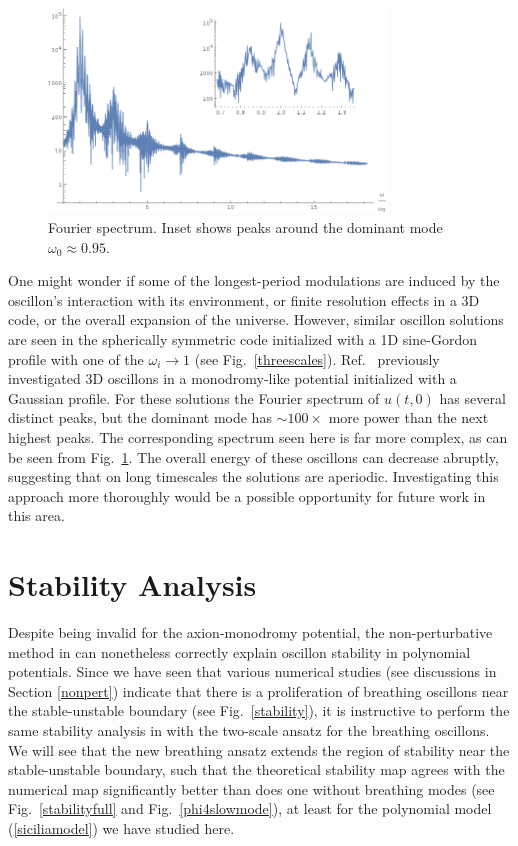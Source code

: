 \documentclass[11pt]{book}
\begin{document}
\begin{figure}
  \centering
  \includegraphics[width=0.8\textwidth]{plot/fourier.png}
  \caption{Fourier spectrum. Inset shows peaks around the dominant mode $\omega_0\approx0.95$.}\label{fourier}
\end{figure}

One might wonder if some of the longest-period modulations are induced by the oscillon's interaction with its environment, or finite resolution effects in a 3D code, or the overall expansion of the universe. However, similar oscillon solutions are seen in the spherically symmetric code initialized with a 1D sine-Gordon profile with one of the $\omega_i\to1$ (see Fig.~\ref{threescales}). Ref.~\cite{Salmi:2012ta} previously investigated 3D oscillons in a monodromy-like potential initialized with a Gaussian profile. For these solutions the Fourier spectrum of $u(t,0)$ has several distinct peaks, but the dominant mode has $\sim 100\times$ more power than the next highest peaks. The corresponding spectrum seen here is far more complex,  as can be seen from  Fig.~\ref{fourier}. The overall energy of these oscillons can decrease abruptly, suggesting that on long timescales the solutions are aperiodic. Investigating this approach more thoroughly would be a possible opportunity for future work in this area.

\chapter{Stability Analysis}\label{chap:stability}

Despite being invalid for the axion-monodromy potential, the non-perturbative method in \cite{Gleiser:2008ty, PhysRevD.80.125037} can nonetheless correctly explain oscillon stability in polynomial potentials. Since we have seen that various numerical studies (see discussions in Section \ref{nonpert}) indicate that there is a proliferation of breathing oscillons near the stable-unstable boundary (see Fig.~\ref{stability}), it is instructive to perform the same stability analysis in \cite{Gleiser:2008ty, PhysRevD.80.125037} with the two-scale ansatz for the breathing oscillons. We will see that the new breathing ansatz extends the region of stability near the stable-unstable boundary, such that the theoretical stability map agrees with the numerical map significantly better than does one without breathing modes (see Fig.~\ref{stabilityfull} and Fig.~\ref{phi4slowmode}), at least for the polynomial model (\ref{siciliamodel}) we have studied here.
\end{document}
